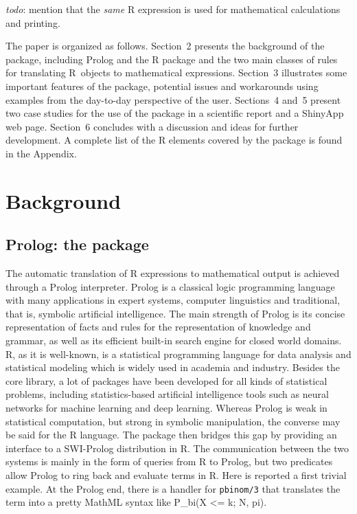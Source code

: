\emph{todo}: mention that the \emph{same} R expression is used for mathematical
calculations and printing.

The paper is organized as follows. Section~2 presents the background of the
package, including Prolog and the R package  and the two main classes
of rules for translating R~objects to mathematical expressions. Section~3
illustrates some important features of the  package, potential
issues and workarounds using examples from the day-to-day perspective of the
user. Sections~4 and~5 present two case studies for the use of the package in
a scientific report and a ShinyApp web page. Section~6 concludes with a
discussion and ideas for further development. A complete list of the R elements
covered by the package is found in the Appendix.

\hypertarget{background}{%
\section{Background}\label{background}}

\hypertarget{prolog-the-package}{%
\subsection{\texorpdfstring{Prolog: the  package}{Prolog: the  package}}\label{prolog-the-package}}

The automatic translation of R expressions to mathematical output is achieved through a Prolog interpreter. Prolog is a classical logic programming language with many applications in expert systems, computer linguistics and traditional, that is, symbolic artificial intelligence. The main strength of Prolog is its concise representation of facts and rules for the representation of knowledge and grammar, as well as its efficient built-in search engine for closed world domains. R, as it is well-known, is a statistical programming language for data analysis and statistical modeling which is widely used in academia and industry. Besides the core library, a lot of packages have been developed for all kinds of statistical problems, including statistics-based artificial intelligence tools such as neural networks for machine learning and deep learning. Whereas Prolog is weak in statistical computation, but strong in symbolic manipulation, the converse may be said for the R language. The  package then bridges this gap by providing an interface to a SWI-Prolog distribution in R. The communication between the two systems is mainly in the form of queries from R to Prolog, but two predicates allow Prolog to ring back and evaluate terms in R.
Here is reported a first trivial example. At the Prolog end, there is a handler for \texttt{pbinom/3} that translates the term into a pretty MathML syntax like P\_bi(X \textless= k; N, pi).

